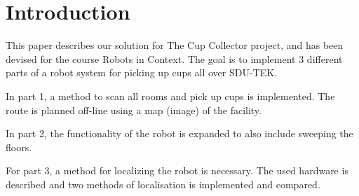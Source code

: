 \section{Introduction}
\label{sec:introduction}
This paper describes our solution for The Cup Collector project, and has been devised for the course Robots in Context. The goal is to implement 3 different parts of a robot system for picking up cups all over SDU-TEK. 

In part 1, a method to scan all rooms and pick up cups is implemented. The route is planned off-line using a map (image) of the facility. 

In part 2, the functionality of the robot is expanded to also include sweeping the floors. 

For part 3, a method for localizing the robot is necessary. The used hardware is described and two methods of localisation is implemented and compared. 